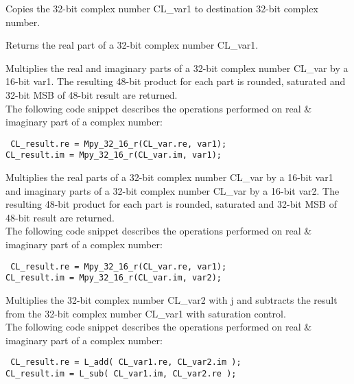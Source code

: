 
Copies the 32-bit complex number CL\_var1 to destination 32-bit complex number.


Returns the real part of a 32-bit complex number CL\_var1.


Multiplies the real and imaginary parts of a 32-bit complex number CL\_var by a 16-bit var1.
The resulting 48-bit product for each part is rounded, saturated and 32-bit MSB of 48-bit result are returned.\\
The following code snippet describes the operations performed on real \& imaginary part of a complex number:

{\tt {} CL\_result.re = Mpy\_32\_16\_r(CL\_var.re, var1);\\
 CL\_result.im = Mpy\_32\_16\_r(CL\_var.im, var1);
}


Multiplies the real parts of a 32-bit complex number CL\_var by a 16-bit var1 and imaginary parts of a 32-bit complex number CL\_var by a 16-bit var2.
The resulting 48-bit product for each part is rounded, saturated and 32-bit MSB of 48-bit result are returned.\\
The following code snippet describes the operations performed on real \& imaginary part of a complex number:

{\tt {} CL\_result.re = Mpy\_32\_16\_r(CL\_var.re, var1);\\
 CL\_result.im = Mpy\_32\_16\_r(CL\_var.im, var2);
}


Multiplies the 32-bit complex number CL\_var2 with j and subtracts the result from the 32-bit complex number CL\_var1 with saturation control.\\
The following code snippet describes the operations performed on real \& imaginary part of a complex number:

{\tt {} CL\_result.re = L\_add( CL\_var1.re, CL\_var2.im );\\
 CL\_result.im = L\_sub( CL\_var1.im, CL\_var2.re );
}

